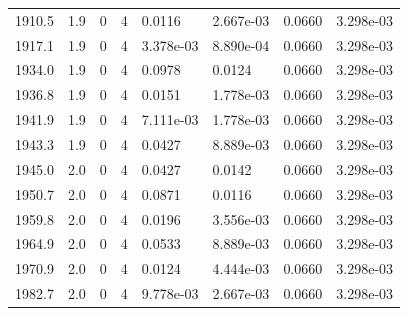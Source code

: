 \documentclass[preview]{standalone}
\begin{document}
{{{{{{{{{{\begin{tabular}{L{1.2cm}C{1.2cm} C{0.3cm}C{0.5cm} C{1.4cm}C{1.4cm} C{1.4cm}C{1.4cm}}
  1910.5  &   1.9  & 0     &  4 &  0.0116  & 2.667e-03  & 0.0660 &  3.298e-03   \\ 
  1917.1  &   1.9  & 0     &  4 &  3.378e-03  & 8.890e-04  & 0.0660 &  3.298e-03   \\ 
  1934.0  &   1.9  & 0     &  4 &  0.0978  & 0.0124  & 0.0660 &  3.298e-03   \\ 
  1936.8  &   1.9  & 0     &  4 &  0.0151  & 1.778e-03  & 0.0660 &  3.298e-03   \\ 
  1941.9  &   1.9  & 0     &  4 &  7.111e-03  & 1.778e-03  & 0.0660 &  3.298e-03   \\ 
  1943.3  &   1.9  & 0     &  4 &  0.0427  & 8.889e-03  & 0.0660 &  3.298e-03   \\ 
  1945.0  &   2.0  & 0     &  4 &  0.0427  & 0.0142  & 0.0660 &  3.298e-03   \\ 
  1950.7  &   2.0  & 0     &  4 &  0.0871  & 0.0116  & 0.0660 &  3.298e-03   \\ 
  1959.8  &   2.0  & 0     &  4 &  0.0196  & 3.556e-03  & 0.0660 &  3.298e-03   \\ 
  1964.9  &   2.0  & 0     &  4 &  0.0533  & 8.889e-03  & 0.0660 &  3.298e-03   \\ 
  1970.9  &   2.0  & 0     &  4 &  0.0124  & 4.444e-03  & 0.0660 &  3.298e-03   \\ 
  1982.7  &   2.0  & 0     &  4 &  9.778e-03  & 2.667e-03  & 0.0660 &  3.298e-03   \\ 
\hline 
\end{tabular} 

}}}}}}}}}}
\end{document}

